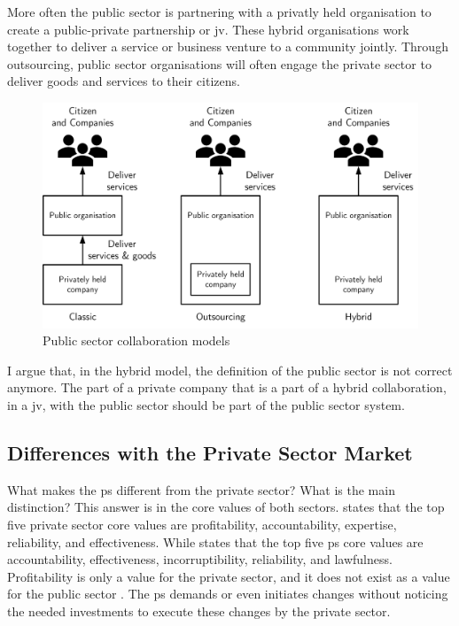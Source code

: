 More often the public sector is partnering with a privatly held organisation to create a public-private partnership or \acrfull{jv}. These hybrid organisations work together to deliver a service or business venture to a community jointly. Through outsourcing, public sector organisations will often engage the private sector to deliver goods and services to their citizens. 

\begin{figure}[H]
	\centering
	\includegraphics[width=0.7\linewidth]{images/publicsector3modelsofcolaboration}
	\caption[Public sector collaboration models]{Public sector collaboration models}
	\label{fig:publicsector3modelsofcolaboration}
\end{figure}

I argue that, in the hybrid model, the definition of the public sector is not correct anymore. The part of a private company that is a part of a hybrid collaboration, in a \gls{jv}, with the public sector should be part of the public sector system.

\subsection{Differences with the Private Sector Market}
\label{sub:tbdifferenceprivatesector}
What makes the \gls{ps} different from the private sector? What is the main distinction? This answer is in the core values of both sectors. \textcite{Wal2008} states that the top five private sector core values are profitability, accountability, expertise, reliability, and effectiveness. While \textcite{Wal2008} states that the top five \gls{ps} core values are accountability, effectiveness, incorruptibility, reliability, and lawfulness. Profitability is only a value for the private sector, and it does not exist as a value for the public sector \parencite{Wal2008}. The \gls{ps} demands or even initiates changes without noticing the needed investments to execute these changes by the private sector.

